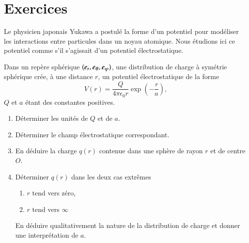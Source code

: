 \section{Exercices}
\begin{exocor}
	Le physicien japonais Yukawa a postulé la forme d'un potentiel pour modéliser
	les interactions entre particules dans un noyau atomique. Nous étudions
	ici ce potentiel comme s'il s'agissait d'un potentiel électrostatique.

	Dans un repère sphérique $(\er, \etheta, \ephi)$, une distribution de 
	charge à symétrie sphérique crée, à une distance $r$,
	un potentiel électrostatique de la forme
	\begin{equation}
		V(r) = \dfrac{Q}{4 \pi \epsilon_0 r} \exp\left(-\dfrac{r}{a}\right),
	\end{equation}
	$Q$ et $a$ étant des constantes positives.

	\begin{enumerate}
		\item Déterminer les unités de $Q$ et de $a$.
		\item Déterminer le champ électrostatique correspondant.
		\item En déduire la charge $q(r)$ contenue dans une sphère de 
		  rayon $r$ et de centre $O$.
		\item Déterminer $q(r)$ dans les deux cas extrêmes
			\begin{enumerate}
				\item $r$ tend vers zéro,
				\item $r$ tend vers $\infty$
			\end{enumerate}
		 En déduire qualitativement la nature de la distribution de charge
		 et donner une interprétation de $a$.
 	\end{enumerate}
\end{exocor}

